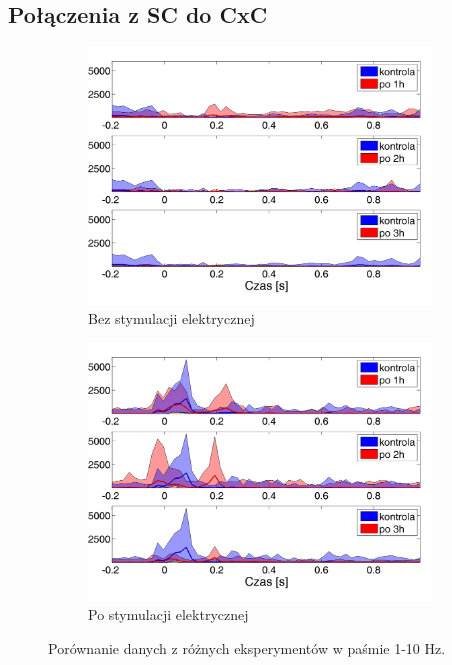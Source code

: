 \documentclass{pracamgr_2}
\begin{document}
\subsection{Połączenia z SC do CxC}
\begin{figure}[h]
	\begin{subfigure}{.5\textwidth}
		\centering
		\includegraphics[width=1.\linewidth]{kontrola15_1-10_z_SC2_do_CxC10.png}
		\caption{Bez stymulacji elektrycznej}
		\label{rys:kon_SC_CxC}
	\end{subfigure}%
	\begin{subfigure}{.5\textwidth}
		\centering
		\includegraphics[width=1.\linewidth]{beta3_1-10_z_SC2_do_CxC8.png}
		\caption{Po stymulacji elektrycznej}
		\label{rys:beta_SC_CxC}
	\end{subfigure}
	\caption{Porównanie danych z różnych eksperymentów w paśmie 1-10 Hz.}
	\label{rys:1_10_SC_CxC}
\end{figure}
\end{document}
